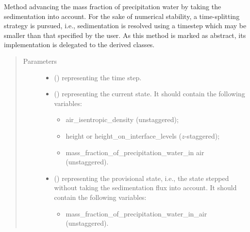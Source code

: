 \documentclass[letterpaper,10pt,english]{sphinxmanual}
\begin{document}
\begin{fulllineitems}
\begin{fulllineitems}
\label{\detokenize{api:tasmania.dycore.prognostic_isentropic.PrognosticIsentropic.step_integrating_sedimentation_flux}}
Method advancing the mass fraction of precipitation water by taking the sedimentation into account.
For the sake of numerical stability, a time-splitting strategy is pursued, i.e., sedimentation is resolved
using a timestep which may be smaller than that specified by the user.
As this method is marked as abstract, its implementation is delegated to the derived classes.
\begin{quote}\begin{description}
\item[{Parameters}] \leavevmode\begin{itemize}
\item {} 
 () \textendash{}  representing the time step.

\item {} 
 () \textendash{} 
{\hyperref[\detokenize{api:tasmania.storages.state_isentropic.StateIsentropic}]{}} representing the current state.
It should contain the following variables:
\begin{itemize}
\item {} 
air\_isentropic\_density (unstaggered);

\item {} 
height or height\_on\_interface\_levels (\(z\)-staggered);

\item {} 
mass\_fraction\_of\_precipitation\_water\_in air (unstaggered).

\end{itemize}


\item {} 
 () \textendash{} 
{\hyperref[\detokenize{api:tasmania.storages.state_isentropic.StateIsentropic}]{}} representing the provisional state, i.e.,
the state stepped without taking the sedimentation flux into account.
It should contain the following variables:
\begin{itemize}
\item {} 
mass\_fraction\_of\_precipitation\_water\_in\_air (unstaggered).


\end{itemize}
\end{itemize}
\end{description}
\end{quote}
\end{fulllineitems}
\end{fulllineitems}
\end{document}
